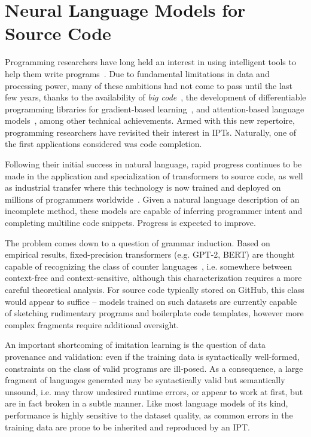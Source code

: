 \documentclass[10pt]{article}
\begin{document}
  \section{Neural Language Models for Source Code}

Programming researchers have long held an interest in using intelligent tools to help them write programs~\cite{bras1993artificial}. Due to fundamental limitations in data and processing power, many of these ambitions had not come to pass until the last few years, thanks to the availability of \textit{big code}~\cite{allamanis2018survey}, the development of differentiable programming libraries for gradient-based learning~\cite{baydin2018automatic}, and attention-based language models~\cite{vaswani2017attention}, among other technical achievements. Armed with this new repertoire, programming researchers have revisited their interest in IPTs. Naturally, one of the first applications considered was code completion.

 Following their initial success in natural language, rapid progress continues to be made in the application and specialization of transformers to source code, as well as industrial transfer where this technology is now trained and deployed on millions of programmers worldwide~\cite{chen2021evaluating}. Given a natural language description of an incomplete method, these models are capable of inferring programmer intent and completing multiline code snippets. Progress is expected to improve.

The problem comes down to a question of grammar induction. Based on empirical results, fixed-precision transformers (e.g. GPT-2, BERT) are thought capable of recognizing the class of counter languages~\cite{bhattamishra2020ability}, i.e. somewhere between context-free and context-sensitive, although this characterization requires a more careful theoretical analysis. For source code typically stored on GitHub, this class would appear to suffice -- models trained on such datasets are currently capable of sketching rudimentary programs and boilerplate code templates, however more complex fragments require additional oversight.

An important shortcoming of imitation learning is the question of data provenance and validation: even if the training data is syntactically well-formed, constraints on the class of valid programs are ill-posed. As a consequence, a large fragment of languages generated may be syntactically valid but semantically unsound, i.e. may throw undesired runtime errors, or appear to work at first, but are in fact broken in a subtle manner. Like most language models of its kind, performance is highly sensitive to the dataset quality, as common errors in the training data are prone to be inherited and reproduced by an IPT.
\end{document}

